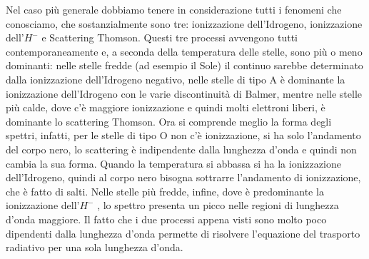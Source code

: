 \documentclass[a4paper,11pt]{article}
\begin{document}
Nel caso più generale dobbiamo tenere in considerazione tutti i fenomeni che conosciamo, che sostanzialmente sono tre: ionizzazione dell'Idrogeno,  ionizzazione dell'\(H^-\) e Scattering Thomson. Questi tre processi avvengono tutti contemporaneamente e, a seconda della temperatura delle stelle, sono più o meno dominanti: nelle stelle fredde (ad esempio il Sole) il continuo sarebbe determinato dalla ionizzazione dell'Idrogeno negativo, nelle stelle di tipo A è dominante la ionizzazione dell'Idrogeno con le varie discontinuità di Balmer, mentre nelle stelle più calde, dove c'è maggiore ionizzazione e quindi molti elettroni liberi, è dominante lo scattering Thomson. Ora si comprende meglio la forma degli spettri, infatti, per le stelle di tipo O non c'è ionizzazione, si ha solo l'andamento del corpo nero, lo scattering è indipendente dalla lunghezza d'onda e quindi non cambia la sua forma. Quando la temperatura si abbassa si ha la ionizzazione dell'Idrogeno, quindi al corpo nero bisogna sottrarre l'andamento di ionizzazione, che è fatto di salti. Nelle stelle più fredde, infine, dove è predominante la ionizzazione dell'\(H^-\) , lo spettro presenta un picco nelle regioni di lunghezza d'onda maggiore. Il fatto che i due processi appena visti sono molto poco dipendenti dalla lunghezza d'onda permette di risolvere l'equazione del trasporto radiativo per una sola lunghezza d'onda. 
\end{document}
